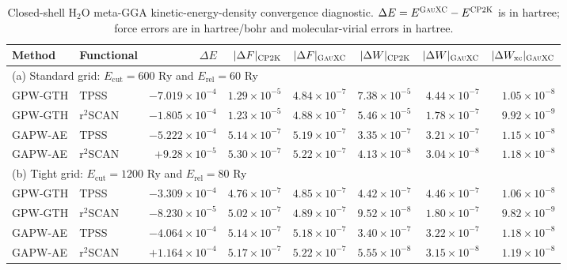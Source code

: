 \documentclass[10pt]{article}
\newcommand{\GauXC}{\textsc{GauXC}}
\newcommand{\CPtwoK}{\textsc{CP2K}}
\newcommand{\GPW}{\textsc{GPW}}
\newcommand{\GAPW}{\textsc{GAPW}}
\newcommand{\GTH}{\textsc{GTH}}
\newcommand{\GPWGTH}{\GPW{}-\GTH{}}
\newcommand{\GAPWAE}{\GAPW{}-AE}
\newcommand{\SITableFont}{\normalsize}
\begin{document}
\begin{table}[htbp]
\centering
\SITableFont
\setlength{\tabcolsep}{2pt}
\caption{{Closed-shell H$_2$O meta-GGA kinetic-energy-density convergence diagnostic.  \(\Delta E=E^{\GauXC{}}-E^{\CPtwoK{}}\) is in hartree; force errors are in hartree/bohr and molecular-virial errors in hartree.}}
\label{tab:si_tau_mgga_convergence}
\begin{tabular}{@{}llrrrrrr@{}}
\hline
Method & Functional & \(\Delta E\) & \(|\Delta F|_{\CPtwoK{}}\) & \(|\Delta F|_{\GauXC{}}\) & \(|\Delta W|_{\CPtwoK{}}\) & \(|\Delta W|_{\GauXC{}}\) & \(|\Delta W_{\mathrm{xc}}|_{\GauXC{}}\)\\
\hline
\multicolumn{8}{l}{(a) Standard grid: \(E_{\mathrm{cut}}=600\) Ry and \(E_{\mathrm{rel}}=60\) Ry}\\
\hline
\GPWGTH{} & TPSS & \(-7.019{\times}10^{-4}\) & \(1.29{\times}10^{-5}\) & \(4.84{\times}10^{-7}\) & \(7.38{\times}10^{-5}\) & \(4.44{\times}10^{-7}\) & \(1.05{\times}10^{-8}\)\\
\GPWGTH{} & r$^2$SCAN & \(-1.805{\times}10^{-4}\) & \(1.23{\times}10^{-5}\) & \(4.88{\times}10^{-7}\) & \(5.46{\times}10^{-5}\) & \(1.78{\times}10^{-7}\) & \(9.92{\times}10^{-9}\)\\
\GAPWAE{} & TPSS & \(-5.222{\times}10^{-4}\) & \(5.14{\times}10^{-7}\) & \(5.19{\times}10^{-7}\) & \(3.35{\times}10^{-7}\) & \(3.21{\times}10^{-7}\) & \(1.15{\times}10^{-8}\)\\
\GAPWAE{} & r$^2$SCAN & \(+9.28{\times}10^{-5}\) & \(5.30{\times}10^{-7}\) & \(5.22{\times}10^{-7}\) & \(4.13{\times}10^{-8}\) & \(3.04{\times}10^{-8}\) & \(1.18{\times}10^{-8}\)\\
\hline
\multicolumn{8}{l}{(b) Tight grid: \(E_{\mathrm{cut}}=1200\) Ry and \(E_{\mathrm{rel}}=80\) Ry}\\
\hline
\GPWGTH{} & TPSS & \(-3.309{\times}10^{-4}\) & \(4.76{\times}10^{-7}\) & \(4.85{\times}10^{-7}\) & \(4.42{\times}10^{-7}\) & \(4.46{\times}10^{-7}\) & \(1.06{\times}10^{-8}\)\\
\GPWGTH{} & r$^2$SCAN & \(-8.230{\times}10^{-5}\) & \(5.02{\times}10^{-7}\) & \(4.89{\times}10^{-7}\) & \(9.52{\times}10^{-8}\) & \(1.80{\times}10^{-7}\) & \(9.82{\times}10^{-9}\)\\
\GAPWAE{} & TPSS & \(-4.064{\times}10^{-4}\) & \(5.14{\times}10^{-7}\) & \(5.18{\times}10^{-7}\) & \(3.40{\times}10^{-7}\) & \(3.22{\times}10^{-7}\) & \(1.18{\times}10^{-8}\)\\
\GAPWAE{} & r$^2$SCAN & \(+1.164{\times}10^{-4}\) & \(5.17{\times}10^{-7}\) & \(5.22{\times}10^{-7}\) & \(5.55{\times}10^{-8}\) & \(3.15{\times}10^{-8}\) & \(1.19{\times}10^{-8}\)\\
\hline
\end{tabular}
\end{table}
\endgroup
\end{document}
